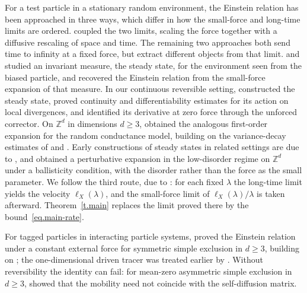 \documentclass[11pt]{amsart}
\theoremstyle{definition}
\theoremstyle{remark}
\numberwithin{equation}{section}
\newcommand{\Zd}{\mathbb Z^d}
\begin{document}
For a test particle in a stationary random environment, the Einstein relation has been approached in three ways, which differ in how the small-force and long-time limits are ordered. \citet{LebowitzRost1994} coupled the two limits, scaling the force together with a diffusive rescaling of space and time. The remaining two approaches both send time to infinity at a fixed force, but extract different objects from that limit. \citet{Steady2018mathieu} and \citet*{GantertGuoNagel2017} studied an invariant measure, the steady state, for the environment seen from the biased particle, and recovered the Einstein relation from the small-force expansion of that measure. In our continuous reversible setting, \citet{Steady2018mathieu} constructed the steady state, proved continuity and differentiability estimates for its action on local divergences, and identified its derivative at zero force through the unforced corrector. On $\Zd$ in dimensions $d\geq3$, \citet*{GantertGuoNagel2017} obtained the analogous first-order expansion for the random conductance model, building on the variance-decay estimates of \citet{vardecay} and \citet{deBuyerMourrat2015}. Early constructions of steady states in related settings are due to \citet{KomorowskiKrupa2004}, and \citet*{CamposRamirez2017} obtained a perturbative expansion in the low-disorder regime on $\Zd$ under a ballisticity condition, with the disorder rather than the force as the small parameter. We follow the third route, due to \citet*{Einstein2012gantert}: for each fixed $\lambda$ the long-time limit yields the velocity $\ell_X(\lambda)$, and the small-force limit of $\ell_X(\lambda)/\lambda$ is taken afterward. Theorem~\ref{t.main} replaces the limit proved there by the bound~\eqref{eq.main-rate}.

For tagged particles in interacting particle systems, \citet{Loulakis2002} proved the Einstein relation under a constant external force for symmetric simple exclusion in $d\geq3$, building on \citet{KipnisVaradhan1986}; the one-dimensional driven tracer was treated earlier by \citet*{LandimOllaVolchan1998}. Without reversibility the identity can fail: for mean-zero asymmetric simple exclusion in $d\geq3$, \citet{Loulakis2005} showed that the mobility need not coincide with the self-diffusion matrix.
\end{document}
